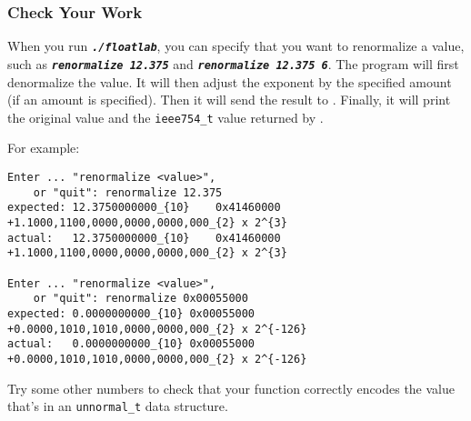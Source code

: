 
\subsubsection*{Check Your Work}

When you run \texttt{\textbf{\textit{./floatlab}}}, you can specify that you want to renormalize a value, such as \texttt{\textbf{\textit{renormalize 12.375}}} and \texttt{\textbf{\textit{renormalize 12.375 6}}}.
The program will first denormalize the value.
It will then adjust the exponent by the specified amount (if an amount is specified).
Then it will send the result to .
Finally, it will print the original value and the \lstinline{ieee754_t} value returned by .

For example:

\begin{verbatim}
Enter ... "renormalize <value>",
    or "quit": renormalize 12.375
expected: 12.3750000000_{10}	0x41460000	+1.1000,1100,0000,0000,0000,000_{2} x 2^{3}
actual:   12.3750000000_{10}	0x41460000	+1.1000,1100,0000,0000,0000,000_{2} x 2^{3}

Enter ... "renormalize <value>",
    or "quit": renormalize 0x00055000
expected: 0.0000000000_{10}	0x00055000	+0.0000,1010,1010,0000,0000,000_{2} x 2^{-126}
actual:   0.0000000000_{10}	0x00055000	+0.0000,1010,1010,0000,0000,000_{2} x 2^{-126}
\end{verbatim}

Try some other numbers to check that your  function correctly encodes the value that's in an \lstinline{unnormal_t} data structure.
